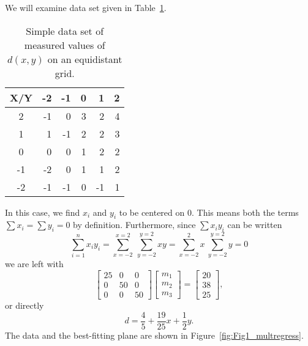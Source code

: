 \begin{example} 
We will examine data set given in Table~\ref{tbl:xy_grid}.
\begin{table}[H]
\center
\begin{tabular}{|c||r|r|r|r|r|} \hline
\bf{X/Y} & -2 & -1 & 0 & 1 & 2 \\ \hline \hline
2 & -1 & 0 & 3 & 2 & 4 \\ \hline
1 & 1 & -1 & 2 & 2 & 3 \\ \hline
0 & 0 & 0 & 1 & 2 & 2 \\ \hline
-1 & -2 & 0 & 1 & 1 & 2  \\ \hline
-2 & -1 & -1 & 0 & -1 & 1 \\ \hline
\end{tabular}
\caption{Simple data set of measured values of $d(x,y)$ on an equidistant grid.}
\label{tbl:xy_grid}
\end{table}
In this case, we find $x_i$ and $y_i$  to be centered on 0.  This means both the terms $\sum x_i = \sum y_i = 0$ by 
definition.  Furthermore, since $\sum {x_i y_i}$ can be written
\begin{equation}
\sum^n_{i=1} x_i y_i = \sum^{x=2}_{x=-2} \ \sum^{y=2}_{y=-2} x y = \sum ^2_{x = -2} x \  \sum^{y=2}_{y=-2} y = 0 
\end{equation}	 
we are left with
\begin{equation}
\left [ \begin{array}{rrr}
25 & 0 & 0 \\
0 & 50 & 0 \\
0 & 0 & 50 \end{array} \right ]
\left [ \begin{array}{c}
m_1\\ m_2\\ m_3 \end{array} \right ] = \left [ \begin{array}{c}
20 \\ 38 \\ 25 \end{array} \right ],
\end{equation}	 
or directly
\begin{equation}
d = \frac{4}{5} + \frac{19}{25}x + \frac{1}{2} y.
\label{eq:example_solution}
\end{equation}
The data and the best-fitting plane are shown in Figure~\ref{fig:Fig1_multregress}.
\end{example}
